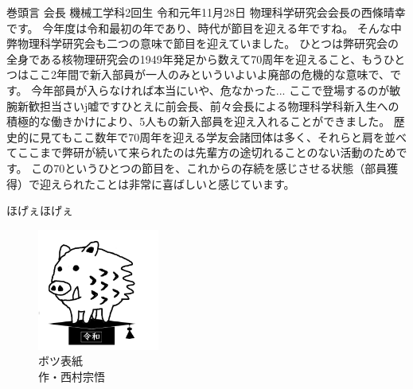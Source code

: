 \documentclass[10pt,b5paper,papersize,dvipdfmx]{jsbook}
\begin{document}
\begin{preface}{巻頭言}
        {会長}%
        {機械工学科2回生}%
        {}%
        {令和元年11月28日}%
  物理科学研究会会長の西條晴幸です。
  今年度は令和最初の年であり、時代が節目を迎える年ですね。
  そんな中弊物理科学研究会も二つの意味で節目を迎えていました。
  ひとつは弊研究会の全身である核物理研究会の1949年発足から数えて70周年を迎えること、もうひとつはここ2年間で新入部員が一人のみといういよいよ廃部の危機的な意味で、です。
  今年部員が入らなければ本当にいや、危なかった...
  ここで登場するのが敏腕新歓担当さいj嘘ですひとえに前会長、前々会長による物理科学科新入生への積極的な働きかけにより、5人もの新入部員を迎え入れることができました。
  歴史的に見てもここ数年で70周年を迎える学友会諸団体は多く、それらと肩を並べてここまで弊研が続いて来られたのは先輩方の途切れることのない活動のためです。
  この70というひとつの節目を、これからの存続を感じさせる状態（部員獲得）で迎えられたことは非常に喜ばしいと感じています。\par
  ほげぇほげぇ
\end{preface}


\clearpage
\quad\vfill
\begin{figure}[htb]
  \centering
  \includegraphics[width=40mm]{img/inoshishi.png}
  \caption*{
    \setlength{\baselineskip}{1.2zw}\gtfamily
    ボツ表紙 \\ 作・西村宗悟
  }
  \label{}
\end{figure}
\vfill
\end{document}
